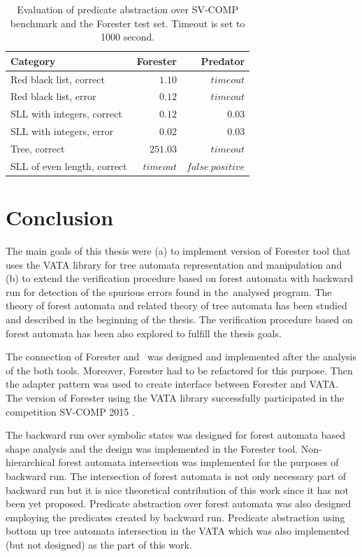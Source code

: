 \begin{table}[h]
	\vskip6pt
	\caption{Evaluation of predicate abstraction over SV-COMP benchmark
		and the Forester test set.
		Timeout is set to 1000 second.
	}
	\centering
	\begin{tabular}{lrr}
		\toprule
		Category & Forester & Predator  \\
		\midrule
		Red black list, correct     & $1.10$   &  $timeout$ \\
		Red black list, error       & $0.12$   &  $timeout$ \\
		SLL with integers, correct  & $0.12$   &  $0.03$ \\
		SLL with integers, error    & $0.02$   &  $0.03$ \\
		Tree, correct               & $251.03$ &  $timeout$ \\
		SLL of even length, correct & $timeout$ & $false\ positive$ \\
		\bottomrule
	\end{tabular}
	\label{tab:patimes}
\end{table}


\chapter{Conclusion}
\label{ch:concl}

The main goals of this thesis were (a) to implement version of Forester tool
that uses the VATA library for tree automata representation and manipulation
and (b) to extend the verification procedure based on forest automata with
backward run for detection of the spurious errors found in the~analysed program.
The theory of forest automata and related theory of tree automata has been studied
and described in the beginning of the thesis.
The verification procedure based on forest automata
has been also explored to fulfill the thesis goals.

The connection of Forester and \vata\ was designed and implemented
after the analysis of the both tools.
Moreover, Forester had to be refactored for this purpose.
Then the adapter pattern was used to create interface between Forester and VATA.
The version of Forester using the VATA library successfully participated
in the competition SV-COMP 2015 \cite{www:svcomp}.

The backward run over symbolic states was designed for forest automata based shape analysis
and the design was implemented in the Forester tool.
Non-hierarchical forest automata intersection was implemented for
the purposes of backward run.
The intersection of forest automata is not only necessary part of backward run
but it is nice theoretical contribution of this work since it has not
been yet proposed.
Predicate abstraction over forest automata was also designed employing the predicates
created by backward run.
Predicate abstraction using bottom up tree automata intersection in the VATA
which was also implemented (but not designed) as the part of this work.

